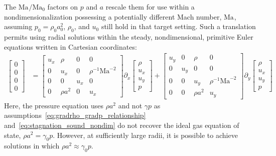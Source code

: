 \documentclass[letterpaper,11pt,nointlimits,reqno]{amsart}
\newcommand{\Mach}[1][]{\mbox{Ma}_{#1}}
\begin{document}
%
The $\Mach/\Mach[0]{}$ factors on $p$ and $a$ rescale them for use within a
nondimensionalization possessing a potentially different Mach number, $\Mach$,
assuming $p_0 = \rho_0 a_0^2$, $\rho_0$, and $u_0$ still hold in that target
setting.  Such a translation permits using radial solutions within the
steady, nondimensional, primitive Euler equations written in Cartesian
coordinates:
%
\begin{align}
  \begin{bmatrix} 0 \\ 0 \\ 0 \\ 0 \end{bmatrix}
&=
  \begin{bmatrix}
     u_x  &  \rho      &  0    &  0                    \\
     0    &  u_x       &  0    &  \rho^{-1}\Mach^{-2}  \\
     0    &  0         &  u_x  &  0                    \\
     0    &  \rho{}a^2 &  0    &  u_x
  \end{bmatrix}
  \partial_x
  \begin{bmatrix} \rho \\ u_x \\ u_y \\ p \end{bmatrix}
+
  \begin{bmatrix}
     u_y  &  0    &  \rho       &  0                    \\
     0    &  u_y  &  0          &  0                    \\
     0    &  0    &  u_y        &  \rho^{-1}\Mach^{-2}  \\
     0    &  0    &  \rho{}a^2  &  u_y
  \end{bmatrix}
  \partial_y
  \begin{bmatrix} \rho \\ u_x \\ u_y \\ p \end{bmatrix}
\end{align}
%
Here, the pressure equation uses $\rho{}a^2$ and not $\gamma{}p$ as
assumptions~\eqref{eq:gradrho_gradp_relationship}
and~\eqref{eq:stagnation_sound_nondim} do not recover the ideal gas equation of
state, $\rho{}a^2=\gamma_{0} p$.  However, at sufficiently large radii, it is
possible to achieve solutions in which $\rho a^2 \approx \gamma_{0} p$.
\end{document}
